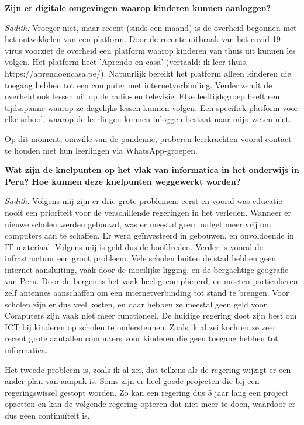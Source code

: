 \textbf{Zijn er digitale omgevingen waarop kinderen kunnen aanloggen?}

\textit{Sadith:} Vroeger niet, maar recent (sinds een maand) is de overheid begonnen met het ontwikkelen van een platform. Door de recente uitbraak van het covid-19 virus voorziet de overheid een platform waarop kinderen van thuis uit kunnen les volgen. Het platform heet 'Aprendo en casa' (vertaald: ik leer thuis, https://aprendoencasa.pe/). Natuurlijk bereikt het platform alleen kinderen die toegang hebben tot een computer met internetverbinding. Verder zendt de overheid ook lessen uit op de radio- en televisie. Elke leeftijdsgroep heeft een tijdsspanne waarop ze dagelijks lessen kunnen volgen. Een specifiek platform voor elke school, waarop de leerlingen kunnen inloggen bestaat naar mijn weten niet. 

Op dit moment, omwille van de pandemie, proberen leerkrachten vooral contact te houden met hun leerlingen via WhatsApp-groepen.

\textbf{Wat zijn de knelpunten op het vlak van informatica in het onderwijs in Peru? Hoe kunnen deze knelpunten weggewerkt worden?}

\textit{Sadith:} Volgens mij zijn er drie grote problemen: eerst en vooral was educatie nooit een prioriteit voor de verschillende regeringen in het verleden. Wanneer er nieuwe scholen werden gebouwd, was er meestal geen budget meer vrij om computers aan te schaffen. Er werd geïnvesteerd in gebouwen, en onvoldoende in IT materiaal. Volgens mij is geld dus de hoofdreden. Verder is vooral de infrastructuur een groot probleem. Vele scholen buiten de stad hebben geen internet-aansluiting, vaak door de moeilijke ligging, en de bergachtige geografie van Peru. Door de bergen is het vaak heel gecompliceerd, en moeten particulieren zelf antennes aanschaffen om een internetverbinding tot stand te brengen. Voor scholen zijn er dus veel kosten, en daar hebben ze meestal geen geld voor. Computers zijn vaak niet meer functioneel. De huidige regering doet zijn best om ICT bij kinderen op scholen te ondersteunen. Zoals ik al zei kochten ze zeer recent grote aantallen computers voor kinderen die geen toegang hebben tot informatica.

Het tweede probleem is, zoals ik al zei, dat telkens als de regering wijzigt er een ander plan van aanpak is. Soms zijn er heel goede projecten die bij een regeringswissel gestopt worden. Zo kan een regering dus 5 jaar lang een project opzetten en kan de volgende regering opteren dat niet meer te doen, waardoor er dus geen continuïteit is.

